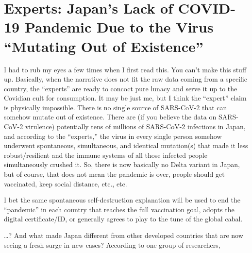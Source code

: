 \chapter{Experts: Japan's Lack of COVID-19 Pandemic Due to the Virus \enquote{Mutating Out of Existence}}

\begin{refsection}

I had to rub my eyes a few times when I first read this. You can't make this stuff up. Basically, when the narrative does not fit the raw data coming from a specific country, the \enquote{experts} are ready to concoct pure lunacy and serve it up to the Covidian cult for consumption. It may be just me, but I think the \enquote{expert} claim is physically impossible. There is no single source of SARS-CoV-2 that can somehow mutate out of existence. There are (if you believe the data on SARS-CoV-2 virulence) potentially tens of millions of SARS-CoV-2 infections in Japan, and according to the \enquote{experts,} the virus in every single person somehow underwent spontaneous, simultaneous, and identical mutation(s) that made it less robust/resilient and the immune systems of all those infected people simultaneously crushed it. So, there is now basically no Delta variant in Japan, but of course, that does not mean the pandemic is over, people should get vaccinated, keep social distance, etc., etc.

I bet the same spontaneous self-destruction explanation will be used to end the \enquote{pandemic} in each country that reaches the full vaccination goal, adopts the digital certificate/ID, or generally agrees to play to the tune of the global cabal.\textsuperscript{\cite{url91283ghn}}

\begin{tcolorbox}[quote]

\dots{}? And what made Japan different from other developed countries that are now seeing a fresh surge in new cases? According to one group of researchers, \textsuperscript{\cite{urlasd90u2s}}

\end{tcolorbox}

\printbibliography[heading=subbibliography]

\end{refsection}